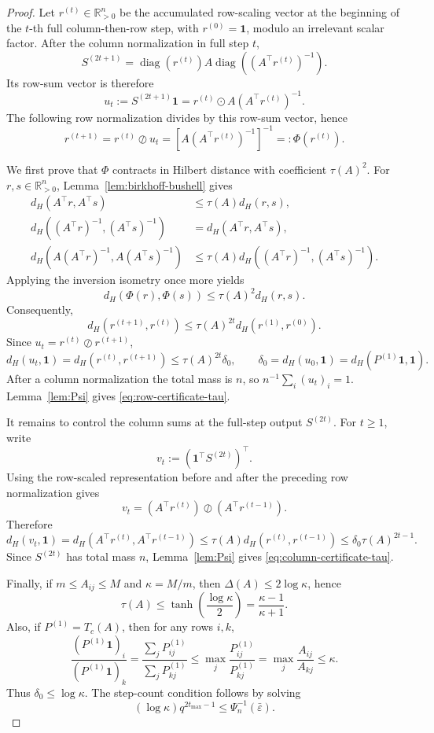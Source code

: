 \documentclass[11pt]{article}
\numberwithin{equation}{section}
\theoremstyle{plain}
\theoremstyle{definition}
\theoremstyle{remark}
\newcommand{\R}{\mathbb{R}}
\newcommand{\ones}{\mathbf{1}}
\newcommand{\diag}{\operatorname{diag}}
\begin{document}
\begin{proof}
Let \(r^{(t)}\in\R_{>0}^n\) be the accumulated row-scaling vector at the
beginning of the \(t\)-th full column-then-row step, with
\(r^{(0)}=\ones\), modulo an irrelevant scalar factor.  After the column
normalization in full step \(t\),
\[
S^{(2t+1)}
=
\diag(r^{(t)})A\diag\!\left((A^\top r^{(t)})^{-1}\right).
\]
Its row-sum vector is therefore
\[
u_t
:=
S^{(2t+1)}\ones
=
r^{(t)}\odot A(A^\top r^{(t)})^{-1}.
\]
The following row normalization divides by this row-sum vector, hence
\[
r^{(t+1)}
=
r^{(t)}\oslash u_t
=
\left[A(A^\top r^{(t)})^{-1}\right]^{-1}
=:\Phi(r^{(t)}).
\]

We first prove that \(\Phi\) contracts in Hilbert distance with coefficient
\(\tau(A)^2\).  For \(r,s\in\R_{>0}^n\), Lemma~\ref{lem:birkhoff-bushell} gives
\begin{align*}
d_H(A^\top r,A^\top s)
&\le \tau(A)d_H(r,s),\\
d_H((A^\top r)^{-1},(A^\top s)^{-1})
&=d_H(A^\top r,A^\top s),\\
d_H(A(A^\top r)^{-1},A(A^\top s)^{-1})
&\le \tau(A)d_H((A^\top r)^{-1},(A^\top s)^{-1}).
\end{align*}
Applying the inversion isometry once more yields
\[
d_H(\Phi(r),\Phi(s))\le \tau(A)^2d_H(r,s).
\]
Consequently,
\[
d_H(r^{(t+1)},r^{(t)})
\le
\tau(A)^{2t}d_H(r^{(1)},r^{(0)}).
\]
Since \(u_t=r^{(t)}\oslash r^{(t+1)}\),
\[
d_H(u_t,\ones)
=
d_H(r^{(t)},r^{(t+1)})
\le
\tau(A)^{2t}\delta_0,
\qquad
\delta_0=d_H(u_0,\ones)=d_H(P^{(1)}\ones,\ones).
\]
After a column normalization the total mass is \(n\), so
\(n^{-1}\sum_i (u_t)_i=1\).  Lemma~\ref{lem:Psi} gives
\eqref{eq:row-certificate-tau}.

It remains to control the column sums at the full-step output \(S^{(2t)}\).  For
\(t\ge1\), write
\[
v_t:=(\ones^\top S^{(2t)})^\top .
\]
Using the row-scaled representation before and after the preceding row
normalization gives
\[
v_t
=
(A^\top r^{(t)})\oslash(A^\top r^{(t-1)}).
\]
Therefore
\[
d_H(v_t,\ones)
=
d_H(A^\top r^{(t)},A^\top r^{(t-1)})
\le
\tau(A)d_H(r^{(t)},r^{(t-1)})
\le
\delta_0\tau(A)^{2t-1}.
\]
Since \(S^{(2t)}\) has total mass \(n\), Lemma~\ref{lem:Psi} gives
\eqref{eq:column-certificate-tau}.

Finally, if \(m\le A_{ij}\le M\) and \(\kappa=M/m\), then
\(\Delta(A)\le2\log\kappa\), hence
\[
\tau(A)\le \tanh\!\left(\frac{\log\kappa}{2}\right)
=
\frac{\kappa-1}{\kappa+1}.
\]
Also, if \(P^{(1)}=T_c(A)\), then for any rows \(i,k\),
\[
\frac{(P^{(1)}\ones)_i}{(P^{(1)}\ones)_k}
=
\frac{\sum_j P^{(1)}_{ij}}{\sum_j P^{(1)}_{kj}}
\le
\max_j\frac{P^{(1)}_{ij}}{P^{(1)}_{kj}}
=
\max_j\frac{A_{ij}}{A_{kj}}
\le
\kappa.
\]
Thus \(\delta_0\le\log\kappa\).  The step-count condition follows by solving
\[
(\log\kappa)q^{2t_{\max}-1}
\le
\Psi_n^{-1}(\bar\varepsilon).
\]
\end{proof}
\end{document}
